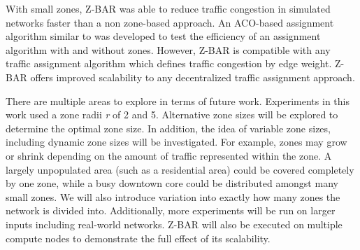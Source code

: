 \documentclass[conference]{IEEEtran}
\begin{document}
With small zones, Z-BAR was able to reduce traffic congestion in simulated networks faster than a non zone-based approach. An ACO-based assignment algorithm similar to \cite{iaco} was developed to test the efficiency of an assignment algorithm with and without zones. However, Z-BAR is compatible with any traffic assignment algorithm which defines traffic congestion by edge weight. Z-BAR offers improved scalability to any decentralized traffic assignment approach.

There are multiple areas to explore in terms of future work. Experiments in this work used a zone radii \textit{r} of 2 and 5. Alternative zone sizes will be explored to determine the optimal zone size. In addition, the idea of variable zone sizes, including dynamic zone sizes will be investigated. For example, zones may grow or shrink depending on the amount of traffic represented within the zone. A largely unpopulated area (such as a residential area) could be covered completely by one zone, while a busy downtown core could be distributed amongst many small zones. We will also introduce variation into exactly how many zones the network is divided into. Additionally, more experiments will be run on larger inputs including real-world networks. Z-BAR will also be executed on multiple compute nodes to demonstrate the full effect of its scalability.
\end{document}
